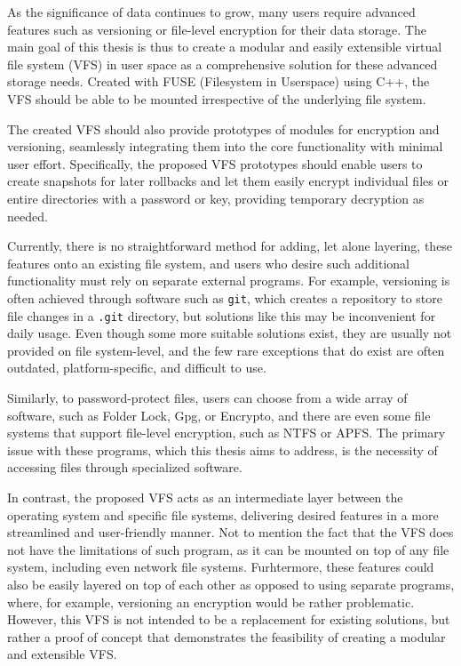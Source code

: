
As the significance of data continues to grow, many users require advanced features such as versioning or file-level encryption for their data storage.
The main goal of this thesis is thus to create a modular and easily extensible virtual file system (VFS) in user space as a comprehensive solution for these advanced storage needs.
Created with FUSE (Filesystem in Userspace) using C++, the VFS should be able to be mounted irrespective of the underlying file system.

The created VFS should also provide prototypes of modules for encryption and versioning, seamlessly integrating them into the core functionality with minimal user effort.
Specifically, the proposed VFS prototypes should enable users to create snapshots for later rollbacks and let them easily encrypt individual files or entire directories with a password or key, providing temporary decryption as needed.

Currently, there is no straightforward method for adding, let alone layering, these features onto an existing file system, and users who desire such additional functionality must rely on separate external programs.
For example, versioning is often achieved through software such as \texttt{git}, which creates a repository to store file changes in a \texttt{.git} directory, but solutions like this may be inconvenient for daily usage.
Even though some more suitable solutions exist, they are usually not provided on file system-level, and the few rare exceptions that do exist are often outdated, platform-specific, and difficult to use.

Similarly, to password-protect files, users can choose from a wide array of software, such as Folder Lock, Gpg, or Encrypto, and there are even some file systems that support file-level encryption, such as NTFS or APFS\@.
The primary issue with these programs, which this thesis aims to address, is the necessity of accessing files through specialized software.

In contrast, the proposed VFS acts as an intermediate layer between the operating system and specific file systems, delivering desired features in a more streamlined and user-friendly manner.
Not to mention the fact that the VFS does not have the limitations of such program, as it can be mounted on top of any file system, including even network file systems.
Furhtermore, these features could also be easily layered on top of each other as opposed to using separate programs, where, for example, versioning an encryption would be rather problematic.
However, this VFS is not intended to be a replacement for existing solutions, but rather a proof of concept that demonstrates the feasibility of creating a modular and extensible VFS\@.

